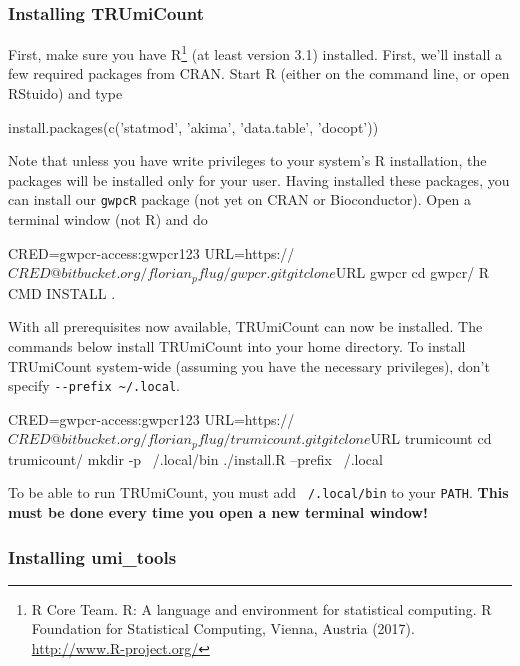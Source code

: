 \documentclass[10pt]{article}
\newcommand{\ddarg}[1]{\texttt{-{}-#1}}
\begin{document}
\subsubsection*{Installing TRUmiCount}

First, make sure you have R\footnote{R Core Team. R: A language and environment for statistical
  computing. R Foundation for Statistical Computing, Vienna, Austria (2017). \url{http://www.R-project.org/}} (at least version 3.1) installed. First, we'll install a few required packages from CRAN. Start R (either on the command line, or open RStuido) and type

\begin{Rcode}
install.packages(c('statmod', 'akima', 'data.table', 'docopt'))
\end{Rcode}

Note that unless you have write privileges to your system's R installation, the packages will be installed only for your user. Having installed these packages, you can install our \texttt{gwpcR} package (not yet on CRAN or Bioconductor). Open a terminal window (not R) and do
  
\begin{shellcode}
CRED=gwpcr-access:gwpcr123
URL=https://$CRED@bitbucket.org/florian_pflug/gwpcr.git
git clone $URL gwpcr
cd gwpcr/
R CMD INSTALL .
\end{shellcode}

With all prerequisites now available, TRUmiCount can now be installed. The commands below install TRUmiCount into your home directory. To install TRUmiCount system-wide (assuming you have the necessary privileges), don't specify \ddarg{prefix \textasciitilde/.local}.

\begin{shellcode}
CRED=gwpcr-access:gwpcr123
URL=https://$CRED@bitbucket.org/florian_pflug/trumicount.git
git clone $URL trumicount
cd trumicount/
mkdir -p ~/.local/bin
./install.R --prefix ~/.local
\end{shellcode}

To be able to run TRUmiCount, you must add \texttt{~/.local/bin} to your \texttt{PATH}. \textbf{This must be done every time you open a new terminal window!}


\subsubsection*{Installing umi\_tools}
\end{document}
